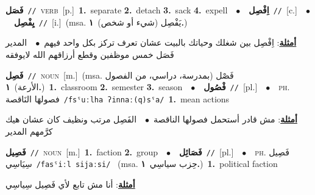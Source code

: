 \documentclass[10pt,a4paper,twoside]{article} %
\begin{document}
\begin{multicols}{2}
{\setlength\topsep{0pt}\textbf{\foreignlanguage{arabic}{فَصَل}}\ {\color{gray}\texttt{//}\color{black}}\ \textsc{verb}\ [p.]\ \textbf{1.}~separate  \textbf{2.}~detach  \textbf{3.}~sack  \textbf{4.}~expell\ \ $\bullet$\ \ \setlength\topsep{0pt}\textbf{\foreignlanguage{arabic}{اِفْصِل}}\ {\color{gray}\texttt{//}\color{black}}\ [c.]\ \ $\bullet$\ \ \setlength\topsep{0pt}\textbf{\foreignlanguage{arabic}{يِفْصِل}}\ {\color{gray}\texttt{//}\color{black}}\ [i.]\ \color{gray}(msa. \foreignlanguage{arabic}{يَفْصِل (شيء أو شخص)}~\foreignlanguage{arabic}{\textbf{١.}})\color{black}\  \begin{flushright}\color{gray}\foreignlanguage{arabic}{\textbf{\underline{\foreignlanguage{arabic}{أمثلة}}}: اِفْصِل بين شغلك وحياتك بالبيت عشان تعرف تركز بكل واحد فيهم\ $\bullet$\ \  المدير فَصَل خمس موظفين وقطع أرزاقهم الله لايوفقه}\end{flushright}\color{black}} \vspace{2mm}

{\setlength\topsep{0pt}\textbf{\foreignlanguage{arabic}{فَصِل}}\ {\color{gray}\texttt{//}\color{black}}\ \textsc{noun}\ [m.]\ \color{gray}(msa. \foreignlanguage{arabic}{فَصْل (بمدرسة، دراسي، من الفصول الأرعة)}~\foreignlanguage{arabic}{\textbf{١.}})\color{black}\ \textbf{1.}~classroom  \textbf{2.}~semester  \textbf{3.}~season\ \ $\bullet$\ \ \setlength\topsep{0pt}\textbf{\foreignlanguage{arabic}{فْصُول}}\ {\color{gray}\texttt{//}\color{black}}\ [pl.]\ \ $\bullet$\ \ \textsc{ph.} \color{gray} \foreignlanguage{arabic}{فصولهَا النَاقصة}\color{black}\ {\color{gray}\texttt{/{\sffamily fsˤuːlha ʔinnaː(q)sˤa}/}\color{black}}\ \textbf{1.}~mean actions\  \begin{flushright}\color{gray}\foreignlanguage{arabic}{\textbf{\underline{\foreignlanguage{arabic}{أمثلة}}}: مش قادر أستحمل فصولها الناقصة\ $\bullet$\ \  الفَصِل مرتب  ونظيف كان عشان هيك كرَّمهم المدير}\end{flushright}\color{black}} \vspace{2mm}

{\setlength\topsep{0pt}\textbf{\foreignlanguage{arabic}{فَصِيل}}\ {\color{gray}\texttt{//}\color{black}}\ \textsc{noun}\ [m.]\ \textbf{1.}~faction  \textbf{2.}~group\ \ $\bullet$\ \ \setlength\topsep{0pt}\textbf{\foreignlanguage{arabic}{فَصَائِل}}\ {\color{gray}\texttt{//}\color{black}}\ [pl.]\ \ $\bullet$\ \ \textsc{ph.} \color{gray} \foreignlanguage{arabic}{فَصِيل سِيَاسِي}\color{black}\ {\color{gray}\texttt{/{\sffamily fasˤiːl sijaːsi}/}\color{black}}\ \color{gray} (msa. \foreignlanguage{arabic}{حِزب سياسِي}~\foreignlanguage{arabic}{\textbf{١.}})\color{black}\ \textbf{1.}~political faction\  \begin{flushright}\color{gray}\foreignlanguage{arabic}{\textbf{\underline{\foreignlanguage{arabic}{أمثلة}}}: أنا مش تابع لأي فَصِيل سِياسِي}\end{flushright}\color{black}} \vspace{2mm}


\end{multicols}
\end{document}
